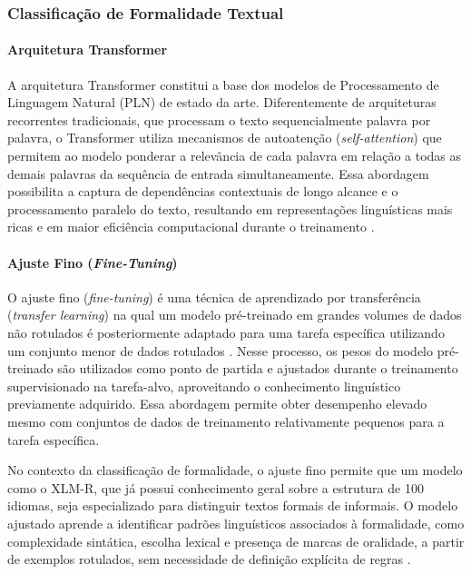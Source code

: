 \documentclass[a4paper,10pt, twocolumn]{article}
\begin{document}
\subsubsection{Classificação de Formalidade Textual}

\paragraph{Arquitetura Transformer}
\label{sec:Transformer}
A arquitetura Transformer \cite{vaswani2017attention} constitui a base dos modelos de Processamento de Linguagem Natural (PLN) de estado da arte. Diferentemente de arquiteturas recorrentes tradicionais, que processam o texto sequencialmente palavra por palavra, o Transformer utiliza mecanismos de autoatenção (\textit{self-attention}) que permitem ao modelo ponderar a relevância de cada palavra em relação a todas as demais palavras da sequência de entrada simultaneamente. Essa abordagem possibilita a captura de dependências contextuais de longo alcance e o processamento paralelo do texto, resultando em representações linguísticas mais ricas e em maior eficiência computacional durante o treinamento \cite{jm3}.

\paragraph{Ajuste Fino (\textit{Fine-Tuning})}
\label{sec:fine-tuned}
O ajuste fino (\textit{fine-tuning}) é uma técnica de aprendizado por transferência (\textit{transfer learning}) na qual um modelo pré-treinado em grandes volumes de dados não rotulados é posteriormente adaptado para uma tarefa específica utilizando um conjunto menor de dados rotulados \cite{jm3}. Nesse processo, os pesos do modelo pré-treinado são utilizados como ponto de partida e ajustados durante o treinamento supervisionado na tarefa-alvo, aproveitando o conhecimento linguístico previamente adquirido. Essa abordagem permite obter desempenho elevado mesmo com conjuntos de dados de treinamento relativamente pequenos para a tarefa específica.

No contexto da classificação de formalidade, o ajuste fino permite que um modelo como o XLM-R, que já possui conhecimento geral sobre a estrutura de 100 idiomas, seja especializado para distinguir textos formais de informais. O modelo ajustado aprende a identificar padrões linguísticos associados à formalidade, como complexidade sintática, escolha lexical e presença de marcas de oralidade, a partir de exemplos rotulados, sem necessidade de definição explícita de regras \cite{dementieva2023detecting}.
\end{document}
